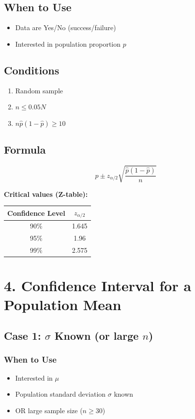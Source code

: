 \documentclass[11pt]{article}
\begin{document}
\subsection*{When to Use}
\begin{itemize}
    \item Data are Yes/No (success/failure)
    \item Interested in population proportion $p$
\end{itemize}

\subsection*{Conditions}
\begin{enumerate}
    \item Random sample
    \item $n \le 0.05N$
    \item $n\hat{p}(1-\hat{p}) \ge 10$
\end{enumerate}

\subsection*{Formula}
\[
\hat{p} \pm z_{\alpha/2} \sqrt{\frac{\hat{p}(1-\hat{p})}{n}}
\]

\textbf{Critical values (Z-table):}

\begin{center}
\begin{tabular}{cc}
\toprule
Confidence Level & $z_{\alpha/2}$ \\
\midrule
90\% & 1.645 \\
95\% & 1.96 \\
99\% & 2.575 \\
\bottomrule
\end{tabular}
\end{center}

\section*{4. Confidence Interval for a Population Mean}

\subsection*{Case 1: $\sigma$ Known (or large $n$)}

\subsubsection*{When to Use}
\begin{itemize}
    \item Interested in $\mu$
    \item Population standard deviation $\sigma$ known
    \item OR large sample size ($n \ge 30$)
\end{itemize}
\end{document}
